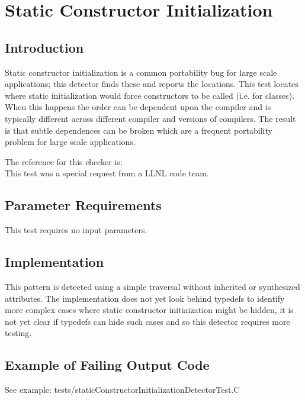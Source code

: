 \section{Static Constructor Initialization}

\label{StaticConstructorInitialization::overview}


\subsection{Introduction}

   Static constructor initialization is a common portability bug for large
scale applications; this detector finds these and reports the locations.
This test locates where static initialization would force constructors to be called
(i.e. for classes).  When this happens the order can be dependent upon the compiler
and is typically different across different compiler and versions of compilers.  The
result is that subtle dependences can be broken which are a frequent portability problem
for large scale applications.

The reference for this checker is: \\
   This test was a special request from a LLNL code team.

\subsection{Parameter Requirements}

   This test requires no input parameters.

\subsection{Implementation}

    This pattern is detected using a simple traversal without inherited 
or synthesized attributes.  The implementation does not yet look behind typedefs to
identify more complex cases where static constructor initiaization might be hidden,
it is not yet clear if typedefs can hide such cases and so this detector requires
more testing.

\subsection{Example of Failing Output Code}

     See example: tests/staticConstructorInitializationDetectorTest.C

\begin{latexonly}
\codeFontSize{

}
\end{latexonly}


